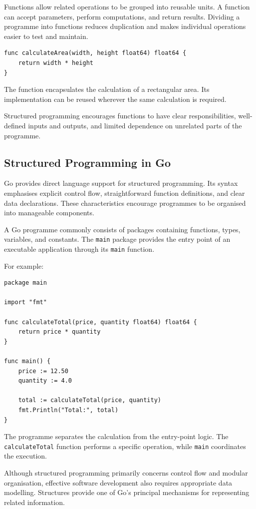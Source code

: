 Functions allow related operations to be grouped into reusable units. A function can accept parameters, perform computations, and return results. Dividing a programme into functions reduces duplication and makes individual operations easier to test and maintain.

\begin{lstlisting}
func calculateArea(width, height float64) float64 {
    return width * height
}
\end{lstlisting}

The function encapsulates the calculation of a rectangular area. Its implementation can be reused wherever the same calculation is required.

Structured programming encourages functions to have clear responsibilities, well-defined inputs and outputs, and limited dependence on unrelated parts of the programme.

\subsection{Structured Programming in Go}

Go provides direct language support for structured programming. Its syntax emphasises explicit control flow, straightforward function definitions, and clear data declarations. These characteristics encourage programmes to be organised into manageable components.

A Go programme commonly consists of packages containing functions, types, variables, and constants. The \texttt{main} package provides the entry point of an executable application through its \texttt{main} function.

For example:

\begin{lstlisting}
package main

import "fmt"

func calculateTotal(price, quantity float64) float64 {
    return price * quantity
}

func main() {
    price := 12.50
    quantity := 4.0

    total := calculateTotal(price, quantity)
    fmt.Println("Total:", total)
}
\end{lstlisting}

The programme separates the calculation from the entry-point logic. The \texttt{calculateTotal} function performs a specific operation, while \texttt{main} coordinates the execution.

Although structured programming primarily concerns control flow and modular organisation, effective software development also requires appropriate data modelling. Structures provide one of Go's principal mechanisms for representing related information.

